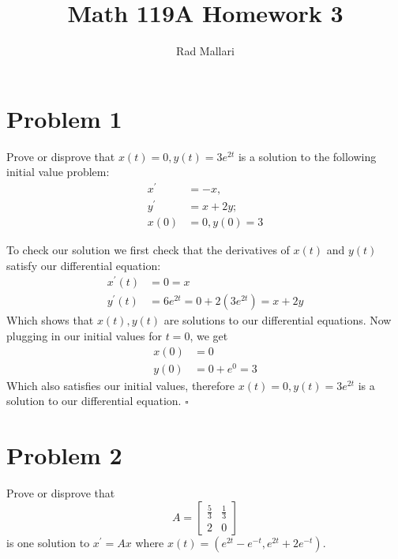 \documentclass[11pt]{article}
\title{Math 119A Homework 3}
\author{Rad Mallari}
\newenvironment{proof}{\noindent{\bf Proof.}}{\hfill $\square$\medskip}
\begin{document}
\maketitle

\section{Problem 1}
Prove or disprove that $x(t)=0,y(t)=3e^{2t}$ is a solution to the following
initial value problem:
\begin{equation}
    \begin{split}
        x^{\prime}&=-x,\\
        y^{\prime}&=x+2y;\\
        x(0)&=0,y(0)=3
    \end{split}
\end{equation}

\begin{proof}
    To check our solution we first check that the derivatives of $x(t)$ and $y(t)$ satisfy
    our differential equation:
    \begin{equation}
        \begin{split}
            x^{\prime}(t)&=0=x\\
            y^{\prime}(t)&=6e^{2t}=0+2(3e^{2t})=x+2y
        \end{split}
    \end{equation}
    Which shows that $x(t),y(t)$ are solutions to our differential equations.
Now plugging in our initial values for $t=0$, we get
\begin{equation}
    \begin{split}
        x(0)&=0\\
        y(0)&=0+e^{0}=3
    \end{split}
\end{equation}
Which also satisfies our initial values, therefore $x(t)=0,y(t)=3e^{2t}$ is a solution
to our differential equation.
\end{proof}

\section{Problem 2}
Prove or disprove that
$$A=\begin{bmatrix}
        \frac{5}{3} & \frac{1}{3} \\
        2           & 0
    \end{bmatrix}$$
is one solution to $x^{\prime}=Ax$ where $x(t)=(e^{2t}-e^{-t},e^{2t}+2e^{-t})$.
\end{document}
